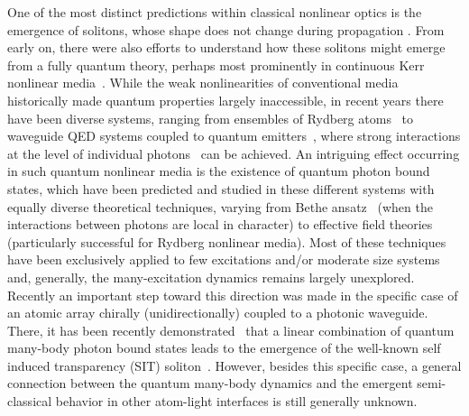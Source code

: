 \documentclass[pra,twocolumn,showpacs,preprintnumbers,amsmath,amssymb]{revtex4-1}
\begin{document}
One of the most distinct predictions within classical nonlinear optics is the emergence of solitons, whose shape does not change during propagation \cite{Agrawal}. From early on, there were also efforts to understand how these solitons might emerge from a fully quantum theory, perhaps most prominently in continuous Kerr nonlinear media~\cite{lai1,lai2,Kurizki1,Kurizki2,Kurizki3}. While the weak nonlinearities of conventional media historically made quantum properties largely inaccessible, in recent years there have been diverse systems, ranging from ensembles of Rydberg atoms~\cite{firstrev,callum,first,LiangBS}  to waveguide QED systems coupled to quantum emitters~\cite{roy_rev_mod,review_lodahl,Darrick_rev_mod,shen_fan_prl,shen_fan,
Harold_strcorr,mahmo_calajo,Harold_bs,Prasadnat}, where strong interactions at the level of individual photons~\cite{changnl} can be achieved. 
An intriguing effect  occurring in such quantum nonlinear media is the existence of  quantum photon bound states, which have been 
predicted and studied in these different systems with equally diverse theoretical techniques, varying from Bethe ansatz~\cite{shen_fan_prl,shen_fan,Bethe,sahandprl} (when the interactions between photons are local in character) to effective field theories \cite{bienas,Efimov,magrebi} (particularly successful for Rydberg nonlinear media).
Most of these techniques have been exclusively applied to few excitations and/or moderate size systems and, generally, the many-excitation dynamics remains largely unexplored. Recently an important step toward this direction 
was made in the specific case of an atomic array chirally (unidirectionally) coupled to a photonic waveguide. There, it has been recently demonstrated~\cite{mahmo_calajo} that a linear combination of quantum 
many-body photon bound states leads to the emergence  of the well-known self induced transparency (SIT) soliton~\cite{McCall1,McCall2,Bullough}. However, besides this specific case, a general connection  between the  quantum many-body dynamics and the emergent semi-classical behavior in other  atom-light interfaces is still generally unknown.

 


\end{document}
